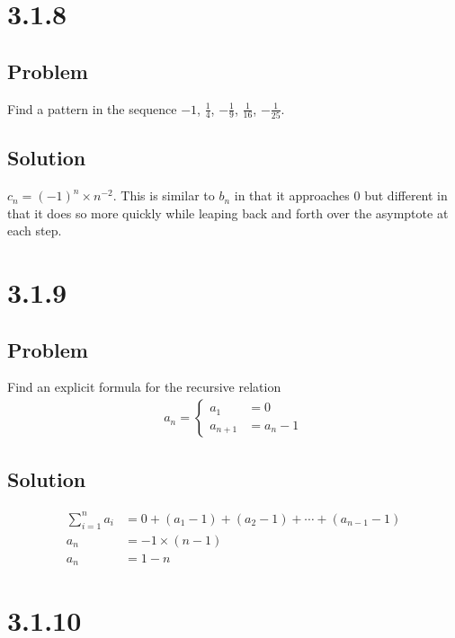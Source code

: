 \documentclass[12pt]{article}
\begin{document}
\section*{3.1.8}

\subsection*{Problem}
Find a pattern in the sequence $-1$, $\frac{1}{4}$, $-\frac{1}{9}$, $\frac{1}{16}$, $-\frac{1}{25}$.

\subsection*{Solution}
$c_n = (-1)^n \times n^{-2}$. This is similar to $b_n$ in that it approaches 0 but different in that it does so more quickly while leaping back and forth over the asymptote at each step.



\section*{3.1.9}

\subsection*{Problem}
Find an explicit formula for the recursive relation
\begin{align*}
    a_n = \begin{cases}
        a_1 &= 0 \\
        a_{n + 1} &= a_n - 1
    \end{cases}
\end{align*}

\subsection*{Solution}
\begin{align*}
    \sum_{i = 1}^n a_i &= 0 + (a_1 - 1) + (a_2 - 1) + \cdots + (a_{n - 1} - 1) \\
    a_n &= -1 \times (n - 1) \\
    a_n &= 1 - n
\end{align*}



\section*{3.1.10}
\end{document}
